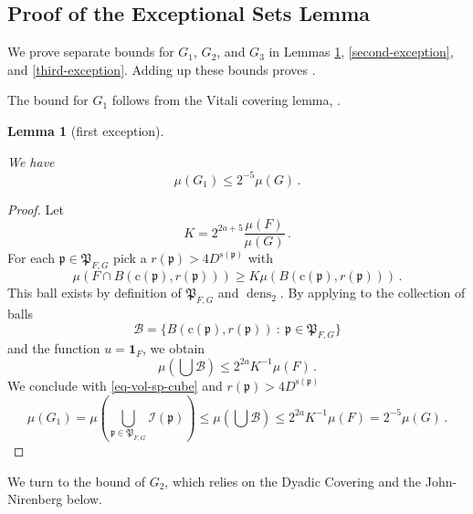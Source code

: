 \documentclass[10pt,a4paper]{article}
\theoremstyle{plain}
\newtheorem{lemma}[theorem]{Lemma}
\theoremstyle{definition}
\numberwithin{equation}{subsection}
\DeclareMathOperator{\dens}{\operatorname{dens}}
\newcommand{\fp}{{\mathfrak p}}
\newcommand{\fP}{{\mathfrak P}}
\newcommand{\pc}{{\mathrm{c}}}
\newcommand{\ps}{{\mathrm{s}}}
\newcommand{\scI}{{\mathcal{I}}} %
\newcommand{\lean}[1]{}
\newcommand{\uses}[1]{}
\newcommand{\leanok}{}
\begin{document}
\subsection{Proof of the Exceptional Sets Lemma}
\label{subsetexcset}


We prove separate bounds for $G_1$, $G_2$, and $G_3$
in Lemmas \ref{first-exception},
\ref{second-exception}, and \ref{third-exception}. Adding up these bounds proves .

The bound for $G_1$ follows from the Vitali covering lemma, .

\begin{lemma}[first exception]
    \label{first-exception}
    \leanok
    \lean{first_exception}
    \uses{Hardy-Littlewood}
    We have
    \begin{equation}
        \mu(G_1)\le 2^{-5}\mu(G)\, .
    \end{equation}
\end{lemma}
\begin{proof}
    \leanok
    Let
    $$
        K = 2^{2a+5}\frac{\mu(F)}{\mu(G)}\,.
    $$
    For each $\fp\in \fP_{F,G}$ pick a
    $r(\fp)>4D^{\ps(\fp)}$ with
    $$
    {\mu(F\cap B(\pc(\fp),r(\fp)))}\ge K{\mu(B(\pc(\fp),r(\fp)))}\, .
    $$
    This ball exists by definition of $\fP_{F,G}$
    and $\dens_2$. By applying  to the collection of balls
    $$
        \mathcal{B} = \{B(\pc(\fp),r(\fp)) \ : \ \fp \in \fP_{F,G}\}
    $$
    and the function $u = \mathbf{1}_F$, we obtain
    $$
        \mu(\bigcup \mathcal{B}) \le 2^{2a} K^{-1} \mu(F)\,.
    $$
    We conclude with \eqref{eq-vol-sp-cube} and $r(\fp)>4D^{\ps(\fp)}$
    $$
        \mu(G_1)= \mu(\bigcup_{\fp\in \fP_{F,G}} \scI(\fp))
        \le \mu(\bigcup \mathcal{B})\le 2^{2a} K^{-1} \mu (F) = 2^{-5}\mu(G)\,.
    $$
\end{proof}


We turn to the bound of $G_2$, which relies on the Dyadic Covering  and the
John-Nirenberg  below.
\end{document}
